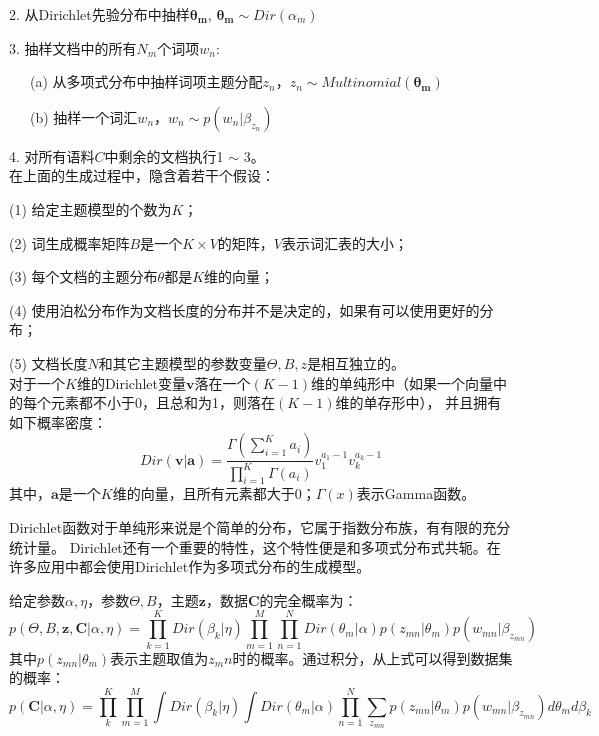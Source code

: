 2. 从Dirichlet先验分布中抽样$\mathbf{\theta_m}$, $\mathbf{\theta_m} \sim Dir(\alpha_m)$

3. 抽样文档中的所有$N_m$个词项$w_n$:

~~~(a) 从多项式分布中抽样词项主题分配$z_n$，$z_n \sim Multinomial(\mathbf{\theta_m})$
   
~~~(b) 抽样一个词汇$w_n$，$w_n \sim p(w_n|\beta_{z_n})$

4. 对所有语料$C$中剩余的文档执行1 $\sim $ 3。\\
在上面的生成过程中，隐含着若干个假设：

(1) 给定主题模型的个数为$K$；

(2) 词生成概率矩阵$B$是一个$K \times V$的矩阵，$V$表示词汇表的大小；

(3) 每个文档的主题分布$\theta$都是$K$维的向量；

(4) 使用泊松分布作为文档长度的分布并不是决定的，如果有可以使用更好的分布；

(5) 文档长度$N$和其它主题模型的参数变量$\Theta, B, z$是相互独立的。\\
对于一个$K$维的Dirichlet变量$\mathbf{v}$落在一个$(K-1)$维的单纯形中（如果一个向量中的每个元素都不小于0，且总和为1，则落在$(K-1)$维的单存形中），
并且拥有如下概率密度：
\begin{equation}
Dir(\mathbf{v }| \mathbf{a} ) = \dfrac{\Gamma(\sum_{i=1}^K{a_i})}{\prod_{i=1}^K{\Gamma(a_i)}} 
v_1^{a_1-1} v_k^{a_k-1}
\end{equation}
其中，$\mathbf{a}$是一个$K$维的向量，且所有元素都大于0；$\Gamma(x)$表示Gamma函数。

Dirichlet函数对于单纯形来说是个简单的分布，它属于指数分布族，有有限的充分统计量。
Dirichlet还有一个重要的特性，这个特性便是和多项式分布式共轭。在许多应用中都会使用Dirichlet作为多项式分布的生成模型。

给定参数$\alpha, \eta$，参数$\Theta, B$，主题$\mathbf{z}$，数据$\mathbf{C}$的完全概率为：
\begin{equation}
p(\Theta, B, \mathbf{z, C} | \alpha, \eta) = \prod_{k=1}^K{Dir(\beta_k|\eta)}
\prod_{m=1}^M{\prod_{n=1}^N{Dir(\theta_m|\alpha)p(z_{mn}|\theta_m)p(w_{mn}|\beta_{z_{mn}})}}
\end{equation}
其中$p(z_{mn}|\theta_m)$表示主题取值为$z_mn$时的概率。通过积分，从上式可以得到数据集的概率：
\begin{equation}
p(\mathbf{C} | \alpha, \eta) = \prod_{k}^K{\prod_{m=1}^M{\int{Dir(\beta_k|\eta)} 
\int{Dir(\theta_m|\alpha)\prod_{n=1}^N{\sum_{z_{mn}}{p(z_{mn}|\theta_m)p(w_{mn}|\beta_{z_{mn}})}}}} d\theta_m }d\beta_k
\end{equation}

